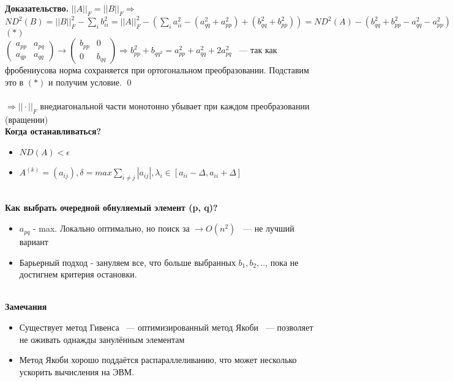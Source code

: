     \textbf{Доказательство.} \(||A||_F = ||B||_F \Rightarrow\)\\
    \(ND^2(B)=||B||_F^2-\sum_ib_{ii}^2=||A||_F^2-(\sum_ia_{ii}^2 - (a_{qq}^2 + a_{pp}^2) + (b_{qq}^2 + b_{pp}^2)) = ND^2(A) - (b_{qq}^2 + b_{pp}^2 -a_{qq}^2 - a_{pp}^2)\) \((*)\)\\
    \(\begin{pmatrix}
        a_{pp} & a_{pq} \\
        a_{qp} & a_{qq}
    \end{pmatrix} \rightarrow \begin{pmatrix}
        b_{pp} & 0 \\
        0 & b_{qq}
    \end{pmatrix}  \Rightarrow b_{pp}^2 + b_{qq^2}=a^2_{pp} + a^2_{qq} + 2a_{pq}^2\) ~--- так как фробениусова норма сохраняется при ортогональном преобразовании. Подставим это в \((*)\) и получим условие. \qed\\
    \\
    \(\Rightarrow ||\cdot||_{F}\) внедиагональной части монотонно убывает при каждом преобразовании (вращении)
    \\

\textbf{Когда останавливаться?}
    \begin{itemize}
        \item \(ND(A) < \epsilon \)
        \item \(A^{(k)}=(a_{ij}), \delta = max \sum_{i\neq j}|a_{ij}|, \lambda_i \in [a_{ii}-\Delta, a_{ii} + \Delta]\)
    \end{itemize} \\

\textbf{Как выбрать очередной обнуляемый элемент (p, q)?}
    \begin{itemize}
        \item \(a_{pq}\) - max. Локально оптимально, но поиск за \(\rightarrow O(n^2)\) ~--- не лучший вариант
        \item Барьерный подход - зануляем все, что больше выбранных \(b_{1}, b_{2},..\), пока не достигнем критерия остановки.
    \end{itemize} \\
    
\textbf{Замечания}
    \begin{itemize}
        \item Существует метод Гивенса ~--- оптимизированный метод Якоби ~--- позволяет не оживать однажды занулённым элементам
        \item Метод Якоби хорошо поддаётся распараллеливанию, что может несколько ускорить вычисления на ЭВМ.
    \end{itemize} \\
    \\

